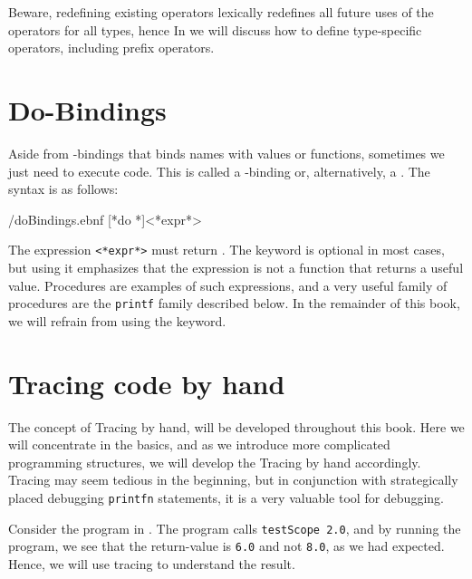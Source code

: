 \documentclass[springer.tex]{subfiles}
\begin{document}
Beware, redefining existing operators lexically redefines all future uses of the operators for all types, hence  In  we will discuss how to define type-specific operators, including prefix operators. 

\section{Do-Bindings}
Aside from -bindings that binds names with values or functions, sometimes we just need to execute code. This is called a -binding or, alternatively, a . The syntax is as follows:
%
\begin{verbatimwrite}{\ebnf/doBindings.ebnf}
[*do *]<*expr*>
\end{verbatimwrite}
%
The expression \lstinline[language=syntax]{<*expr*>} must return . The keyword  is optional in most cases, but using it emphasizes that the expression is not a function that returns a useful value. Procedures are examples of such expressions, and a very useful family of procedures are the \lstinline{printf} family described below. In the remainder of this book, we will refrain from using the  keyword.

\section{Tracing code by hand}
The concept of Tracing by hand, will be developed throughout this book. Here we will concentrate in the basics, and as we introduce more complicated programming structures, we will develop the Tracing by hand accordingly. Tracing may seem tedious in the beginning, but in conjunction with strategically placed debugging \lstinline!printfn! statements, it is a very valuable tool for debugging.

Consider the program in .
%
%
The program calls \lstinline{testScope 2.0}, and by running the program, we see that the return-value is \lstinline{6.0} and not \lstinline{8.0}, as we had expected. Hence, we will use tracing to understand the result.
\end{document}
